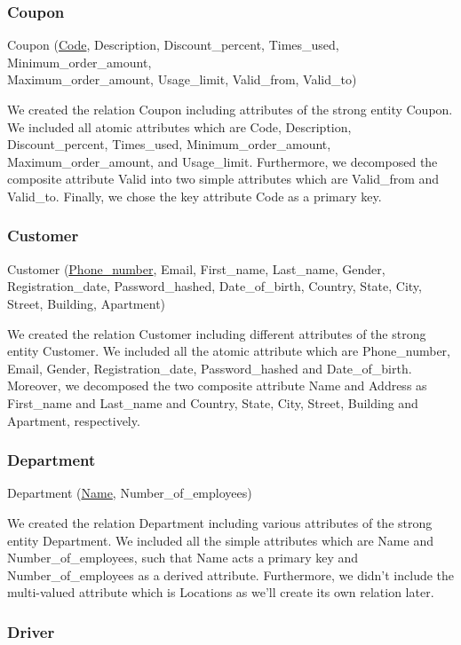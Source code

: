 \documentclass[11pt]{article}
\begin{document}
\subsubsection{Coupon}

Coupon (\underline{Code}, Description, Discount\_percent, Times\_used, Minimum\_order\_amount,\\
Maximum\_order\_amount, Usage\_limit, Valid\_from, Valid\_to)

We created the relation Coupon including attributes of the strong entity Coupon. We included all atomic attributes which are Code, Description, Discount\_percent, Times\_used, Minimum\_order\_amount, Maximum\_order\_amount, and Usage\_limit. Furthermore, we decomposed the composite attribute Valid into two simple attributes which are Valid\_from and Valid\_to. Finally, we chose the key attribute Code as a primary key.

\subsubsection{Customer}

Customer (\underline{Phone\_number}, Email, First\_name, Last\_name, Gender, Registration\_date, Password\_hashed, Date\_of\_birth, Country, State, City, Street, Building, Apartment)

We created the relation Customer including different attributes of the strong entity Customer. We included all the atomic attribute which are Phone\_number, Email, Gender, Registration\_date, Password\_hashed and Date\_of\_birth. Moreover, we decomposed the two composite attribute Name and Address as First\_name and Last\_name and Country, State, City, Street, Building and Apartment, respectively.

\subsubsection{Department}

Department (\underline{Name}, Number\_of\_employees)

We created the relation Department including various attributes of the strong entity Department. We included all the simple attributes which are Name and Number\_of\_employees, such that Name acts a primary key and Number\_of\_employees as a derived attribute. Furthermore, we didn't include the multi-valued attribute which is Locations as we'll create its own relation later.


\subsubsection{Driver}
\end{document}
